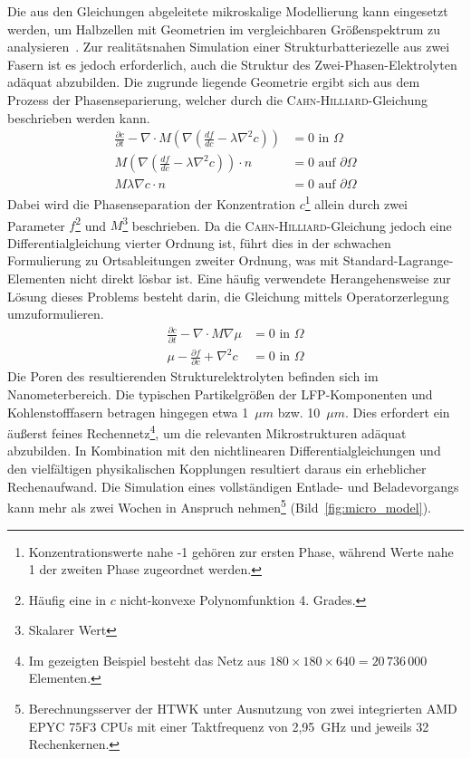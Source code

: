 Die aus den Gleichungen abgeleitete mikroskalige Modellierung kann eingesetzt werden, um Halbzellen mit Geometrien im vergleichbaren Größenspektrum zu analysieren~\cite{Plett2015}. Zur realitätsnahen Simulation einer Strukturbatteriezelle aus zwei Fasern ist es jedoch erforderlich, auch die Struktur des Zwei-Phasen-Elektrolyten adäquat abzubilden\cite{Tu2020}. Die zugrunde liegende Geometrie ergibt sich aus dem Prozess der Phasenseparierung, welcher durch die \textsc{Cahn-Hilliard}-Gleichung beschrieben werden kann\cite{Carolan2015,Grant1993}.
\begin{align}
    \frac{\partial c}{\partial t} - \nabla \cdot M \left( \nabla \left( \frac{df}{dc} - \lambda \nabla^2 c\right) \right) &= 0 \text{ in }\Omega\\
    M\left( \nabla \left( \frac{df}{dc} - \lambda \nabla^2 c \right)\right) \cdot n &= 0 \text{ auf }\partial\Omega\\
    M \lambda \nabla c \cdot n &= 0 \text{ auf }\partial\Omega
\end{align}
Dabei wird die Phasenseparation der Konzentration $c$\footnote{Konzentrationswerte nahe -1 gehören zur ersten Phase, während Werte nahe 1 der zweiten Phase zugeordnet werden.} allein durch zwei Parameter $f$\footnote{Häufig eine in $c$ nicht-konvexe Polynomfunktion 4. Grades.} und $M$\footnote{Skalarer Wert} beschrieben. Da die \textsc{Cahn-Hilliard}-Gleichung jedoch eine Differentialgleichung vierter Ordnung ist, führt dies in der schwachen Formulierung zu Ortsableitungen zweiter Ordnung, was mit Standard-Lagrange-Elementen nicht direkt lösbar ist. Eine häufig verwendete Herangehensweise zur Lösung dieses Problems besteht darin, die Gleichung mittels Operatorzerlegung umzuformulieren.
\begin{align}
    \frac{\partial c}{\partial t} - \nabla \cdot M \nabla \mu &= 0 \text{ in }\Omega\\
    \mu - \frac{\partial f}{\partial c} + \nabla^2 c &= 0 \text{ in }\Omega
\end{align}
Die Poren des resultierenden Strukturelektrolyten befinden sich im Nanometerbereich. Die typischen Partikelgrößen der LFP-Komponenten und Kohlenstofffasern betragen hingegen etwa 1~$\mu m$ bzw. 10~$\mu m$. Dies erfordert ein äußerst feines Rechennetz\footnote{Im gezeigten Beispiel besteht das Netz aus $180 \times 180 \times 640 = 20\,736\,000$ Elementen.}, um die relevanten Mikrostrukturen adäquat abzubilden.
In Kombination mit den nichtlinearen Differentialgleichungen und den vielfältigen physikalischen Kopplungen resultiert daraus ein erheblicher Rechenaufwand. Die Simulation eines vollständigen Entlade- und Beladevorgangs kann mehr als zwei Wochen in Anspruch nehmen\footnote{Berechnungsserver der HTWK unter Ausnutzung von zwei integrierten AMD EPYC 75F3 CPUs mit einer Taktfrequenz von 2{,}95~GHz und jeweils 32 Rechenkernen.} (Bild~\ref{fig:micro_model}).


